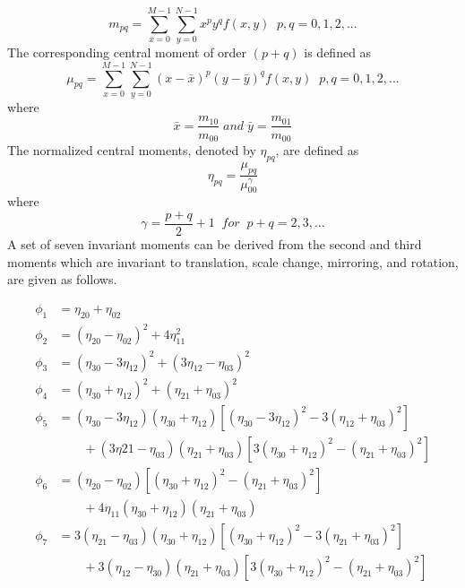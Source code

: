 \documentclass[12pt,a4paper,oneside]{article}
\numberwithin{equation}{section}
\numberwithin{algorithm}{section}
\begin{document}
	\begin{equation}\label{equation_digital_moments}
	m_{pq}=\sum\limits_{x=0}^{M-1}\sum\limits_{y=0}^{N-1}x^py^qf(x,y) \;\;  p,q = 0,1 , 2, ...
	\end{equation}
	The corresponding central moment of order $(p+q)$ is defined as
	\begin{equation}\label{equation_central_digital_moments}
	\mu_{pq}=\sum\limits_{x=0}^{M-1}\sum\limits_{y=0}^{N-1}(x-\bar{x})^p(y-\bar{y})^qf(x,y) \;\;  p,q = 0,1 , 2, ...
	\end{equation}
	where
	\begin{equation}\label{equation_xbar_ybar}
	\bar{x}=\frac{m_{10}}{m_{00}} \; and \; \bar{y}=\frac{m_{01}}{m_{00}}
	\end{equation}
	The normalized central moments, denoted by $\eta_{pq}$, are defined as
	\begin{equation}\label{equation_central_normalized_moments}
	\eta_{pq}=\frac{\mu_{pq}}{\mu^{\gamma}_{00}}
	\end{equation}
	where
	\begin{equation}\label{equation_gamma}
	\gamma=\frac{p+q}{2}+1 \;\; for\;\; p+q=2,3,...
	\end{equation}
	A set of seven invariant moments can be derived from the second  and third moments \cite{Hu1962} which are invariant to translation, scale change, mirroring, and rotation, are given as follows.
	
	\begin{subequations}
	\begin{align}
	\phi_1 &=\eta_{20}+\eta_{02} \\
	\phi_2&=(\eta_{20}-\eta_{02})^2+4\eta^2_{11} \\
	\phi_3&=(\eta_{30}-3\eta_{12})^2+(3\eta_{12}-\eta_{03})^2 \\
	\phi_4&= (\eta_{30}+\eta_{12})^2+(\eta_{21}+\eta_{03})^2 \\
	\phi_5&=(\eta_{30}-3\eta_{12})(\eta_{30}+\eta_{12})[(\eta_{30}-3\eta_{12})^2-3(\eta_{12}+\eta_{03})^2] \nonumber \\
	&\qquad +(3\eta{21}-\eta_{03})(\eta_{21}+\eta_{03})[3(\eta_{30}+\eta_{12})^2-(\eta_{21}+\eta_{03})^2] \\
	\phi_6&=(\eta_{20}-\eta_{02})[(\eta_{30}+\eta_{12})^2-(\eta_{21}+\eta_{03})^2] \nonumber \\
	&\qquad +4\eta_{11}(\eta_{30}+\eta_{12})(\eta_{21}+\eta_{03}) \\
	\phi_7&=3(\eta_{21}-\eta_{03})(\eta_{30}+\eta_{12})[(\eta_{30}+\eta_{12})^2-3(\eta_{21}+\eta_{03})^2] \nonumber\\
	&\qquad +3(\eta_{12}-\eta_{30})(\eta_{21}+\eta_{03})[3(\eta_{30}+\eta_{12})^2-(\eta_{21}+\eta_{03})^2]
	\end{align}
	\end{subequations}
	
\end{document}
